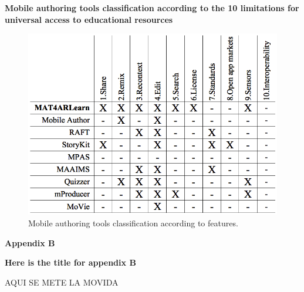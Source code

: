 \textbf{Mobile authoring tools classification according to the 10 limitations for universal access to educational resources}

\begin{small}


\begin{figure}[H]
	\includegraphics[width=1\linewidth]{img/table3}
	\caption{Mobile authoring tools classification according to features.}
	\label{table3} 
\end{figure}



\end{small}



\clearpage{\pagestyle{empty}\cleardoublepage}

\begin{Large}
\textbf{Appendix B} 
\end{Large}
\vspace{3em}

\textbf{Here is the title for appendix B}

\begin{small}

AQUI SE METE LA MOVIDA

\end{small}



\clearpage{\pagestyle{empty}\cleardoublepage}
